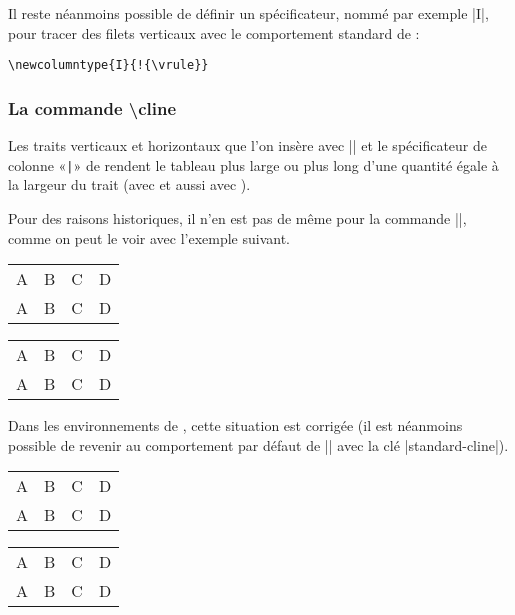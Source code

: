 \documentclass[dvipsnames]{article}%
\begin{document}
\medskip
Il reste néanmoins possible de définir un spécificateur, nommé par exemple
|I|, pour tracer des filets verticaux avec le comportement standard de
 :
%
\begin{Verbatim}
\newcolumntype{I}{!{\vrule}}
\end{Verbatim}




\subsubsection{La commande  \textbackslash cline}

\label{remark-cline}

Les traits verticaux et horizontaux que l'on insère avec |\hline| et le
spécificateur de colonne «\verb+|+» de  rendent le tableau plus large
ou plus long d'une quantité égale à la largeur du trait (avec  et
aussi avec ).

\smallskip
Pour des raisons historiques, il n'en est pas de même pour la commande |\cline|,
comme on peut le voir avec l'exemple suivant.

\medskip
\begin{Code}[width=10cm]
\setlength{\arrayrulewidth}{2pt}
\begin{tabular}{cccc} \hline
A&B&C&D \\ \emph{\cline{2-2}}
A&B&C&D \\ \hline
\end{tabular}
\end{Code}
%
\begin{scope}
\setlength{\arrayrulewidth}{2pt}
\begin{tabular}[c]{cccc}
\hline
A&B&C&D \\
\cline{2-2}
A&B&C&D \\
\hline
\end{tabular}
\end{scope}

\medskip
{}
Dans les environnements de , cette situation est corrigée (il
est néanmoins possible de revenir au comportement par défaut de |\cline| avec la
clé |standard-cline|).

\medskip
\begin{Code}[width=10cm]
\setlength{\arrayrulewidth}{2pt}
\begin{NiceTabular}{cccc} \hline
A&B&C&D \\ \emph{}
A&B&C&D \\ \hline
\end{NiceTabular}
\end{Code}
%
\begin{scope}
\setlength{\arrayrulewidth}{2pt}
\begin{NiceTabular}[c]{cccc}
\hline
A&B&C&D \\
A&B&C&D \\
\hline
\end{NiceTabular}
\end{scope}
\end{document}
